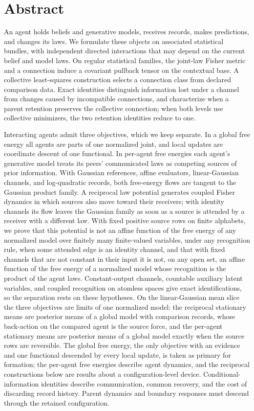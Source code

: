 \chapter*{Abstract}
An agent holds beliefs and generative models, receives records, makes predictions, and changes its laws. We formulate these objects on associated statistical bundles, with independent directed interactions that may depend on the current belief and model laws. On regular statistical families, the joint-law Fisher metric and a connection induce a covariant pullback tensor on the contextual base. A collective least-squares construction selects a connection class from declared comparison data. Exact identities distinguish information lost under a channel from changes caused by incompatible connections, and characterize when a parent retention preserves the collective connection; when both levels use collective minimizers, the two retention identities reduce to one.

Interacting agents admit three objectives, which we keep separate. In a global free energy all agents are parts of one normalized joint, and local updates are coordinate descent of one functional. In per-agent free energies each agent's generative model treats its peers' communicated laws as competing sources of prior information. With Gaussian references, affine evaluators, linear-Gaussian channels, and log-quadratic records, both free-energy flows are tangent to the Gaussian product family. A reciprocal law potential generates coupled Fisher dynamics in which sources also move toward their receivers; with identity channels its flow leaves the Gaussian family as soon as a source is attended by a receiver with a different law. With fixed positive source rows on finite alphabets, we prove that this potential is not an affine function of the free energy of any normalized model over finitely many finite-valued variables, under any recognition rule, when some attended edge is an identity channel, and that with fixed channels that are not constant in their input it is not, on any open set, an affine function of the free energy of a normalized model whose recognition is the product of the agent laws. Constant-output channels, countable auxiliary latent variables, and coupled recognition on atomless spaces give exact identifications, so the separation rests on these hypotheses. On the linear-Gaussian mean slice the three objectives are limits of one normalized model: the reciprocal stationary means are posterior means of a global model with comparison records, whose back-action on the compared agent is the source force, and the per-agent stationary means are posterior means of a global model exactly when the source rows are reversible. The global free energy, the only objective with an evidence and one functional descended by every local update, is taken as primary for formation; the per-agent free energies describe agent dynamics, and the reciprocal constructions below are results about a configuration-level device. Conditional-information identities describe communication, common recovery, and the cost of discarding record history. Parent dynamics and boundary responses must descend through the retained configuration.

